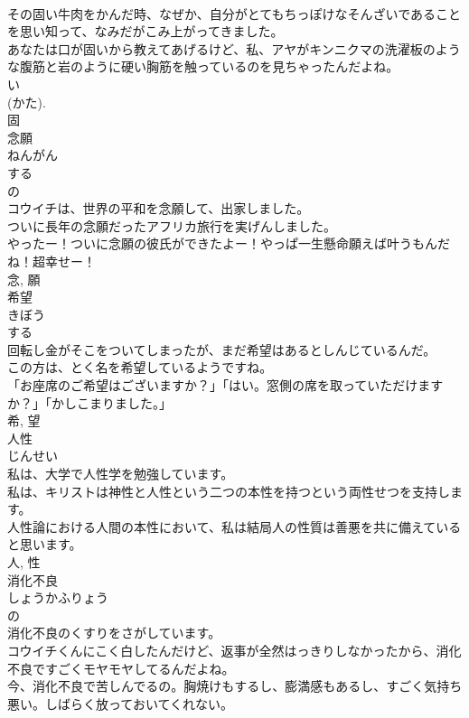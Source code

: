 \documentclass[8pt]{extreport}
\begin{document}
\begin{CJK}{UTF8}{min}
\\	その固い牛肉をかんだ時、なぜか、自分がとてもちっぽけなそんざいであることを思い知って、なみだがこみ上がってきました。	
\\	あなたは口が固いから教えてあげるけど、私、アヤがキンニクマの洗濯板のような腹筋と岩のように硬い胸筋を触っているのを見ちゃったんだよね。	
\\	い 
\\	(かた). 
\\	固	
\\	念願	
\\	ねんがん	
\\	する 
\\	の 
\\	コウイチは、世界の平和を念願して、出家しました。	
\\	ついに長年の念願だったアフリカ旅行を実げんしました。	
\\	やったー！ついに念願の彼氏ができたよー！やっぱ一生懸命願えば叶うもんだね！超幸せー！	
\\	念, 願	
\\	希望	
\\	きぼう	
\\	する 
\\	回転し金がそこをついてしまったが、まだ希望はあるとしんじているんだ。	
\\	この方は、とく名を希望しているようですね。	
\\	「お座席のご希望はございますか？」「はい。窓側の席を取っていただけますか？」「かしこまりました。」	
\\	希, 望	
\\	人性	
\\	じんせい	
\\	私は、大学で人性学を勉強しています。	
\\	私は、キリストは神性と人性という二つの本性を持つという両性せつを支持します。	
\\	人性論における人間の本性において、私は結局人の性質は善悪を共に備えていると思います。	
\\	人, 性	
\\	消化不良	
\\	しょうかふりょう	
\\	の 
\\	消化不良のくすりをさがしています。	
\\	コウイチくんにこく白したんだけど、返事が全然はっきりしなかったから、消化不良ですごくモヤモヤしてるんだよね。	
\\	今、消化不良で苦しんでるの。胸焼けもするし、膨満感もあるし、すごく気持ち悪い。しばらく放っておいてくれない。	

\end{CJK}
\end{document}
